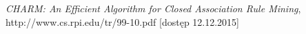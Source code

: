 
\begin{thebibliography}{99}

 \emph{CHARM: An Efficient Algorithm for Closed Association Rule Mining}, http://www.cs.rpi.edu/tr/99-10.pdf  [dostęp 12.12.2015]



\end{thebibliography}
